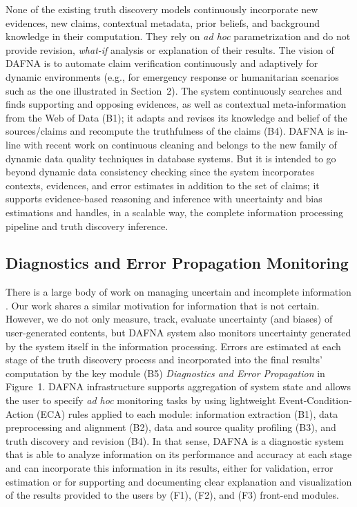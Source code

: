 \documentclass[prodmode,acmtecs]{acmsmall} %
\begin{document}
None of the existing truth discovery models continuously incorporate new evidences, 
new claims, contextual metadata, prior beliefs, and background knowledge in their computation.
They rely on {\it ad hoc} parametrization and do not provide revision, {\it what-if} analysis
or explanation of their results. The vision of DAFNA is to automate claim verification continuously
and adaptively for dynamic environments (e.g., for emergency response or humanitarian scenarios such
as the one illustrated in Section~2). The system continuously searches and finds supporting and opposing 
evidences, as well as contextual meta-information from the Web of Data (B1); it adapts and revises its knowledge
and belief of the sources/claims and recompute the truthfulness of the claims (B4).  
DAFNA is in-line with recent work on continuous cleaning \cite{VCSM14} and belongs to the new family of dynamic data 
quality techniques in database systems. But it is intended to go beyond dynamic data consistency checking since the 
system incorporates contexts, evidences, and error estimates in addition to the set of claims; it supports evidence-based
reasoning and inference with uncertainty and bias estimations and handles, in a scalable way, the complete information processing
pipeline and truth discovery inference.

\subsection{Diagnostics and Error Propagation Monitoring}


There is a large body of work on managing uncertain and incomplete information \cite{GreenT06,AgrawalSUW10}. Our work shares a similar 
motivation for information that is not certain. However, we do not only measure, track, evaluate uncertainty (and biases) of user-generated 
contents, but DAFNA system also monitors uncertainty generated by the system itself in the information processing. Errors are estimated at 
each stage of the truth discovery process and incorporated into the final results' computation by the key module (B5) {\it Diagnostics and Error
Propagation} in Figure~1. DAFNA infrastructure supports aggregation of system state and allows the user to specify {\it ad hoc} monitoring tasks 
by using lightweight Event-Condition-Action (ECA) rules applied to each module: information extraction (B1),  data preprocessing and alignment (B2),
data and source quality profiling (B3), and truth discovery  and revision (B4). In that sense,  DAFNA is a diagnostic system that is able to analyze 
information on its performance and accuracy at each stage and can incorporate this information in its results, either for validation, error estimation
or for supporting and documenting clear  explanation and visualization of the results provided to the users by (F1), (F2), and (F3) front-end modules. 
\end{document}
